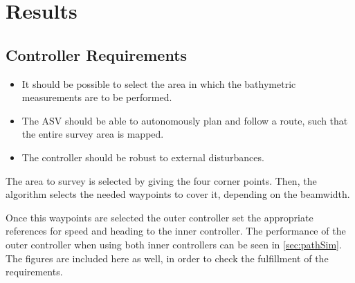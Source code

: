 \chapter{Results}\label{chap:results}

\section{Controller Requirements}
\begin{itemize}
    \item It should be possible to select the area in which the bathymetric measurements are to be performed.
    \item The ASV should be able to autonomously plan and follow a route, such that the entire survey area is mapped.
    \item The controller should be robust to external disturbances.
\end{itemize}

The area to survey is selected by giving the four corner points. Then, the algorithm selects the needed waypoints to cover it, depending on the beamwidth.

Once this waypoints are selected the outer controller set the appropriate references for speed and heading to the inner controller. The performance of the outer controller when using both inner controllers can be seen in \autoref{sec:pathSim}. The figures are included here as well, in order to check the fulfillment of the requirements.

